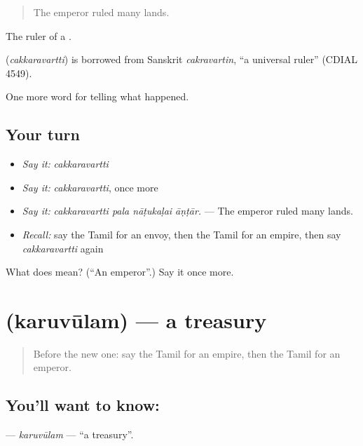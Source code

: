 \begin{quote}
The emperor ruled many lands.
\end{quote}

The ruler of a .

\begin{cousinweb}
\textbf{} (\emph{cakkaravartti}) is borrowed from Sanskrit \emph{cakravartin}, \textquotedblleft{}a universal ruler\textquotedblright{} (CDIAL 4549).
\end{cousinweb}

\begin{grammarlens}[title={What you've built}]
One more word for telling what happened.
\end{grammarlens}

\subsection*{Your turn}
\begin{itemize}
\raggedright
  \item \emph{Say it:} \emph{cakkaravartti}
  \item \emph{Say it:} \emph{cakkaravartti}, once more
  \item \emph{Say it:} \emph{cakkaravartti pala nāṭukaḷai āṇṭār.} — The emperor ruled many lands.
  \item \emph{Recall:} say the Tamil for an envoy, then the Tamil for an empire, then say \emph{cakkaravartti} again
\end{itemize}

\begin{tcolorbox}[breakable,colback=teal!4,colframe=teal!35!black,title={Before you move on}]
What does  mean? (\textquotedblleft{}An emperor\textquotedblright{}.) Say it once more.
\end{tcolorbox}
\section[\texorpdfstring{\ta{கருவூலம்} (karuvūlam)}{கருவூலம் (karuvūlam)}]{ (karuvūlam) — a treasury}

\label{lesson:TA-C330-karuvulam}



\begin{quote}
Before the new one: say the Tamil for an empire, then the Tamil for an emperor.
\end{quote}

\subsection*{You'll want to know: }
\textbf{} — \emph{karuvūlam} — \textquotedblleft{}a treasury\textquotedblright{}.

